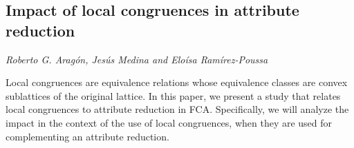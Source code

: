 \documentclass[../booklet.tex]{subfiles}
\begin{document}
\subsection[Impact of local congruences in attribute reduction. {\it Roberto G. Aragón, Jesús Medina and Eloísa Ramírez-Poussa}]{Impact of local congruences in attribute reduction}
  

\begin{center}
  {\it Roberto G. Aragón, Jesús Medina and Eloísa Ramírez-Poussa}
\end{center}

\vskip 0.8cm


Local congruences are equivalence relations whose equivalence classes are convex sublattices of the original lattice. In this paper, we present a study that relates local congruences to attribute reduction in FCA. Specifically,   we will analyze the impact in the context of the use of local congruences, when they are used  for complementing an attribute reduction.


\end{document}
